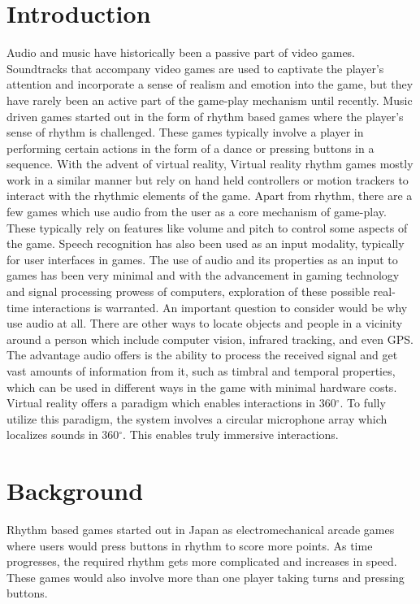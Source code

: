 \documentclass[convention]{aesconf}
\begin{document}
\section{Introduction}
Audio and music have historically been a passive part of video games. Soundtracks that accompany video games are used to captivate the player's attention and incorporate a sense of realism and emotion into the game, but they have rarely been an active part of the game-play mechanism until recently.
Music driven games started out in the form of rhythm based games where the player's sense of rhythm is challenged. These games typically involve a player in performing certain actions in the form of a dance or pressing buttons in a sequence. With the advent of virtual reality, 
Virtual reality rhythm games mostly work in a similar manner but rely on hand held controllers or motion trackers to interact with the rhythmic elements of the game.
Apart from rhythm, there are a few games which use audio from the user as a core mechanism of game-play. These typically rely on features like volume and pitch to control some aspects of the game.
Speech recognition has also been used as an input modality, typically for user interfaces in games.
The use of audio and its properties as an input to games has been very minimal and with the advancement in gaming technology and signal processing prowess of computers, exploration of these possible real-time interactions is warranted.
An important question to consider would be why use audio at all. There are other ways to locate objects and people in a vicinity around a person which include computer vision, infrared tracking, and even GPS. The advantage audio offers is the ability to process the received signal and get vast amounts of information from it, such as timbral and temporal properties, which can be used in different ways in the game with minimal hardware costs.
Virtual reality offers a paradigm which enables interactions in 360$^\circ$. To fully utilize this paradigm, the system involves a circular microphone array which localizes sounds in 360$^\circ$. This enables truly immersive interactions.

\section{Background}
Rhythm based games started out in Japan as electromechanical arcade games where users would press buttons in rhythm to score more points. As time progresses, the required rhythm gets more complicated and increases in speed. These games would also involve more than one player taking turns and pressing buttons.
\end{document}
